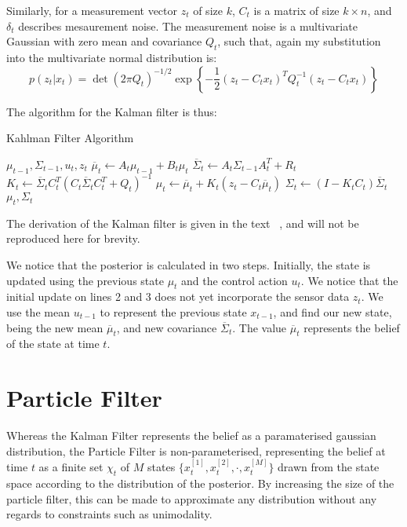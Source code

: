 \documentclass[english]{article}
\begin{document}
Similarly, for a measurement vector $z_t$ of size $k$, $C_t$ is a matrix of size $k \times n$, and $\delta_t$ describes mesaurement noise. The measurement noise is a multivariate Gaussian with zero mean and covariance $Q_t$, such that, again my substitution into the multivariate normal distribution is:
\begin{equation}
	p(z_t | x_t) = \det(2 \pi Q_t)^{-1/2} \exp\left\{-\frac{1}{2}(z_t - C_t x_t)^T Q_t^{-1}(z_t - C_t x_t)\right\}
\end{equation}

The algorithm for the Kalman filter is thus:

\begin{algorithm}
\caption{Kahlman Filter Algorithm}
\label{alg:kalman}
\begin{algorithmic}[1]
	\REQUIRE $\mu_{t-1}, \Sigma_{t-1}, u_t, z_t$
	\STATE $\overline{\mu}_t \leftarrow A_t\mu_{t-1} + B_t \mu_t$
	\STATE $\overline{\Sigma}_t \leftarrow A_t \Sigma_{t-1}A_t^T + R_t$
	\STATE
	\STATE $K_t \leftarrow \overline{\Sigma}_t C_t^T\left(C_t \overline{\Sigma}_t C_t^T + Q_t\right)^{-1}$
	\STATE $\mu_t \leftarrow \overline{\mu}_t + K_t\left(z_t - C_t \overline{\mu}_t\right)$
	\STATE $\Sigma_t \leftarrow (I-K_t C_t)\overline{\Sigma}_t$
	\RETURN $\mu_t, \Sigma_t$
\end{algorithmic}
\end{algorithm}

The derivation of the Kalman filter is given in the text ~\cite{probrob}, and will not be reproduced here for brevity.

We notice that the posterior is calculated in two steps. Initially, the state is updated using the previous state $\mu_t$ and the control action $u_t$. We notice that the initial update on lines 2 and 3 does not yet incorporate the sensor data $z_t$. We use the mean $u_{t-1}$ to represent the previous state $x_{t-1}$, and find our new state, being the new mean $\overline{\mu}_t$, and new covariance $\overline{\Sigma}_t$. The value $\overline{\mu}_t$ represents the belief of the state at time $t$.

\section*{Particle Filter}

Whereas the Kalman Filter represents the belief as a paramaterised gaussian distribution, the Particle Filter is non-parameterised, representing the belief at time $t$ as a finite set $\chi_t$ of $M$ states $\{x^{[1]}_t, x^{[2]}_t, \cdot , x^{[M]}_t\}$ drawn from the state space according to the distribution of the posterior. By increasing the size of the particle filter, this can be made to approximate any distribution without any regards to constraints such as unimodality.
\end{document}
